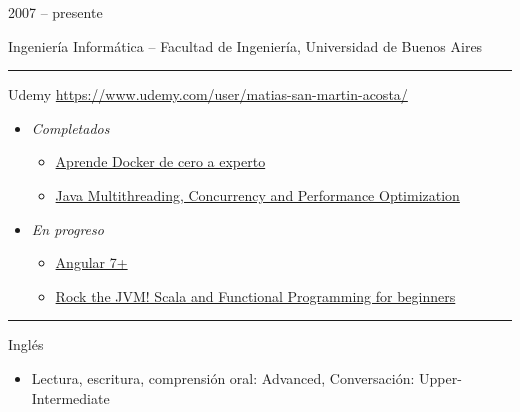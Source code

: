 \documentclass[a4paper,10pt]{article}
\newlength{\cvcolumngapwidth}
\newlength{\cvleftcolumnwidth}
\newlength{\cvrightcolumnwidth}
\newcommand{\cvsectionstyle}[1]{{\normalsize\cvsectionfont\textcolor{cvsectioncolor}{#1}}}
\newcommand{\cvtitlestyle}[1]{{\large\cvtitlefont\textcolor{cvtitlecolor}{#1}}}
\newcommand{\cvdurationstyle}[1]{{\small\cvdurationfont\textcolor{cvdurationcolor}{#1}}}
\newlength{\cvafteritemskipamount}
\newlength{\cvaftersectionskipamount}
\newlength{\cvaftertitleskipamount}
\newlength{\cvparskip}
\newcommand{\cvsection}[1]{
    \begin{minipage}[t]{\cvleftcolumnwidth}
        \raggedleft\cvsectionstyle{#1}
    \end{minipage}%
    \hspace{\cvcolumngapwidth}%
    \begin{minipage}[t]{\cvrightcolumnwidth}
        \textcolor{cvrulecolor}{\rule{\cvrightcolumnwidth}{0.6mm}}
    \end{minipage}

    \vspace{\cvaftersectionskipamount}
}
\newcommand{\cvitem}[2]{
    \begin{minipage}[t]{\cvleftcolumnwidth}
        \raggedleft #1
    \end{minipage}%
    \hspace{\cvcolumngapwidth}%
    \begin{minipage}[t]{\cvrightcolumnwidth}
        \setlength{\parskip}{\cvparskip} #2
    \end{minipage}

    \vspace{\cvafteritemskipamount}
}
\newcommand{\cvtitle}[1]{
    \cvtitlestyle{#1}

    \vspace{\cvaftertitleskipamount}
    \vspace{-\cvparskip}
}
\begin{document}
\cvitem{
    \cvdurationstyle{2007 -- presente}
}{
    \cvtitle{Ingeniería Informática -- \normalsize Facultad de Ingeniería, Universidad de Buenos Aires}
     
}


\cvsection{CURSOS}

\cvitem{
    \cvdurationstyle{}
}{
    \cvtitle{Udemy \normalsize \href{https://www.udemy.com/user/matias-san-martin-acosta/}{https://www.udemy.com/user/matias-san-martin-acosta/}}
    
    \begin{itemize}[leftmargin=*]
    
        \item \emph{Completados}
            \begin{itemize}[leftmargin=*]
                \item \href{https://www.udemy.com/certificate/UC-VANR3KSW/}{Aprende Docker de cero a experto}
                \item \href{https://www.udemy.com/certificate/UC-Y0TQHFO5/}{Java Multithreading, Concurrency and Performance Optimization}
            \end{itemize}
        \item \emph{En progreso}
            \begin{itemize}[leftmargin=*]
            \item \href{https://www.udemy.com/angular-2-fernando-herrera/}{Angular 7+}
            \item \href{https://www.udemy.com/course/rock-the-jvm-scala-for-beginners/}{Rock the JVM! Scala and Functional Programming for beginners}
            \end{itemize}
        
    \end{itemize}
}

\cvsection{IDIOMAS}

\cvitem{
    \cvdurationstyle{}
}{
    \cvtitle{Inglés}
    \begin{itemize}[leftmargin=*]
        \item Lectura, escritura, comprensión oral: Advanced, Conversación: Upper-Intermediate
    \end{itemize}
}
\end{document}
